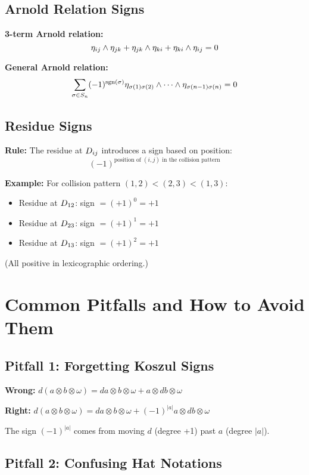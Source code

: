 \subsection{Arnold Relation Signs}

\textbf{3-term Arnold relation:}
$$\eta_{ij} \wedge \eta_{jk} + \eta_{jk} \wedge \eta_{ki} + \eta_{ki} \wedge \eta_{ij} = 0$$

\textbf{General Arnold relation:}
$$\sum_{\sigma \in S_n} (-1)^{\text{sgn}(\sigma)} \eta_{\sigma(1)\sigma(2)} \wedge \cdots \wedge \eta_{\sigma(n-1)\sigma(n)} = 0$$

\subsection{Residue Signs}

\textbf{Rule:} The residue at $D_{ij}$ introduces a sign based on position:
$$(-1)^{\text{position of } (i,j) \text{ in the collision pattern}}$$

\textbf{Example:} For collision pattern $(1,2) < (2,3) < (1,3)$:
\begin{itemize}
\item Residue at $D_{12}$: sign $= (+1)^0 = +1$
\item Residue at $D_{23}$: sign $= (+1)^1 = +1$
\item Residue at $D_{13}$: sign $= (+1)^2 = +1$
\end{itemize}

(All positive in lexicographic ordering.)

\section{Common Pitfalls and How to Avoid Them}

\subsection{Pitfall 1: Forgetting Koszul Signs}

\textbf{Wrong:} $d(a \otimes b \otimes \omega) = da \otimes b \otimes \omega + a \otimes db \otimes \omega$

\textbf{Right:} $d(a \otimes b \otimes \omega) = da \otimes b \otimes \omega + (-1)^{|a|} a \otimes db \otimes \omega$

The sign $(-1)^{|a|}$ comes from moving $d$ (degree +1) past $a$ (degree $|a|$).

\subsection{Pitfall 2: Confusing Hat Notations}

